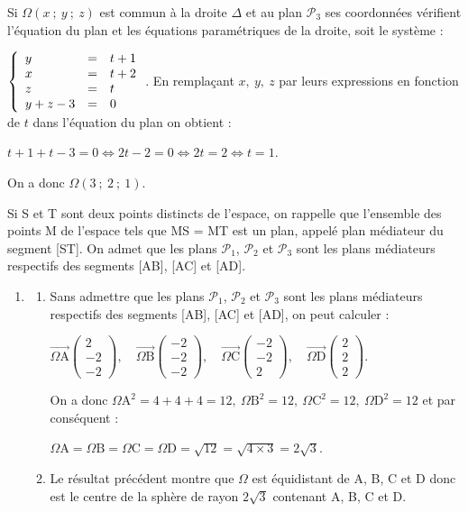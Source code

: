 \documentclass[10pt]{article}
\providecommand{\vect}[1]{\overrightarrow{#1}}
\begin{document}
\begin{enumerate}
Si $\Omega(x~;~y~;~z)$ est commun à la droite $\Delta$ et au plan $\mathcal{P}_3$ ses coordonnées vérifient l'équation du plan et les équations paramétriques de la droite, soit le système :

$\left\{\begin{array}{l c l}
y&=&t + 1\\
x &=&t + 2\\
z&=&t\\
y + z - 3&=&0
\end{array}\right.$. En remplaçant $x,\:y,\:z$ par leurs expressions en fonction de $t$ dans l'équation du plan on obtient :

$t + 1 + t - 3= 0 \iff 2t - 2 = 0 \iff 2t = 2 \iff t = 1$.

On a donc $\Omega\left(3~;~2~;~1 \right)$.
\end{enumerate}

\medskip

Si S et T sont deux points distincts de l'espace, on rappelle que l'ensemble des points M de l'espace tels que MS = MT est un plan, appelé plan médiateur du segment [ST]. On admet que les plans $\mathcal{P}_1$,\: $\mathcal{P}_2$ et $\mathcal{P}_3$ sont les plans médiateurs respectifs des segments [AB], [AC] et [AD].

\begin{enumerate}[resume]
\item
	\begin{enumerate}
		\item 
Sans admettre que les plans $\mathcal{P}_1$,\: $\mathcal{P}_2$ et $\mathcal{P}_3$ sont les plans médiateurs respectifs des segments [AB], [AC] et [AD], on peut calculer :

$\vect{\Omega \text{A}}\begin{pmatrix}2\\-2\\-2\end{pmatrix},\quad \vect{\Omega \text{B}}\begin{pmatrix}-2\\-2\\-2\end{pmatrix}, \quad \vect{\Omega \text{C}}\begin{pmatrix}-2\\-2\\2\end{pmatrix},\quad \vect{\Omega \text{D}}\begin{pmatrix}2\\2\\2\end{pmatrix}$.

On a donc $\Omega\text{A}^2 = 4 + 4 + 4 = 12, \: \Omega\text{B}^2 = 12,\: \Omega\text{C}^2 = 12, \: \Omega\text{D}^2 = 12$ et par conséquent :

$\Omega\text{A} = \Omega\text{B} = \Omega\text{C} = \Omega\text{D} = \sqrt{12} = \sqrt{4 \times 3} = 2\sqrt{3}$.
		\item 


Le résultat précédent montre que $\Omega$ est équidistant de A, B, C et D donc est le centre de la sphère de rayon $2\sqrt{3}$ contenant A, B, C et D.
	\end{enumerate}
\end{enumerate}
\end{document}
